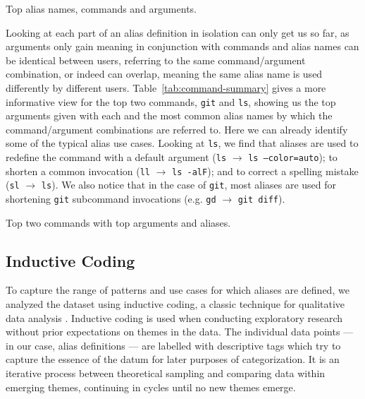 \documentclass[smallextended,natbib]{svjour3}
\newcommand{\alias}[2]{{\texttt{#1} $\rightarrow$ \texttt{#2}}}
\begin{document}
\begin{table}
    \centering
    \caption{Top alias names, commands and arguments.}
    \label{tab:top-summary}
    
\end{table}

Looking at each part of an alias definition in isolation can only get us so far, as arguments only gain meaning in conjunction with commands and alias names can be identical between users, referring to the same command/argument combination, or indeed can overlap, meaning the same alias name is used differently by different users.
Table~\ref{tab:command-summary} gives a more informative view for the top two commands, \texttt{git} and \texttt{ls}, showing us the top arguments given with each and the most common alias names by which the command/argument combinations are referred to.
Here we can already identify some of the typical alias use cases.
Looking at \texttt{ls}, we find that aliases are used
to redefine the command with a default argument (\alias{ls}{ls --color=auto});
to shorten a common invocation (\alias{ll}{ls -alF});
and to correct a spelling mistake (\alias{sl}{ls}).
We also notice that in the case of \texttt{git}, most aliases are used for shortening \texttt{git} subcommand invocations (e.g. \alias{gd}{git diff}).

\begin{table}
    \centering
    \caption{Top two commands with top arguments and aliases.}
    \label{tab:command-summary}
    
\end{table}

\subsection{Inductive Coding}

To capture the range of patterns and use cases for which aliases are defined, we analyzed the dataset using inductive coding, a classic technique for qualitative data analysis \citep{saldana:16,thomas:06,dey:03}.
Inductive coding is used when conducting exploratory research without prior expectations on themes in the data.
The individual data points --- in our case, alias definitions --- are labelled with descriptive tags which try to capture the essence of the datum for later purposes of categorization.
It is an iterative process between theoretical sampling and comparing data within emerging themes, continuing in cycles until no new themes emerge.
\end{document}
